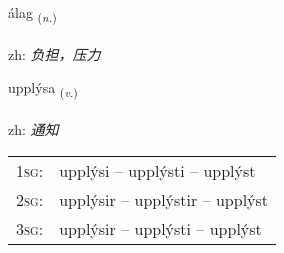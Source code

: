 \documentclass[frontgrid, backgrid]{flacards}\usepackage[]{graphicx}\usepackage[]{color}
\begin{document}
{álag \small{\textsubscript{(\textit{n.})}} \\[1ex] %
\textphonetic{[auːlaɣ]} \\
zh: \emph{负担，压力} \\  [2ex]
\renewcommand*{\arraystretch}{0.8}
}

\renewcommand{\flhead}{\vskip5pt \fboxsep=0pt {\small\bfseries\footnotesize Sagnorð | 动词}}
\renewcommand{\fcfoot}{\vskip5pt \fboxsep=0pt \hspace{2pt}{\small\bfseries\footnotesize 2K}}

\renewcommand{\blhead}{\vskip5pt {\small\bfseries\footnotesize Sagnorð | 动词 }}
\renewcommand{\bcfoot}{\vskip5pt \hspace{2pt}{\small\bfseries\footnotesize 2K}}


{upplýsa \small{\textsubscript{(\textit{v.})}} \\[1ex] %
\textphonetic{[ʏhplisa]} \\
zh: \emph{通知} \\  [2ex]
\renewcommand*{\arraystretch}{0.8}
\begin{tabular}{p{1cm}l}
\textsc{1sg}: & upplýsi -- upplýsti -- upplýst \\ 
\textsc{2sg}: & upplýsir -- upplýstir -- upplýst \\ 
\textsc{3sg}: & upplýsir -- upplýsti -- upplýst \\ 
\end{tabular}
}

\renewcommand{\flhead}{\vskip5pt \fboxsep=0pt {\small\bfseries\footnotesize Nafnorð | 名词}}
\renewcommand{\fcfoot}{\vskip5pt \fboxsep=0pt \hspace{2pt}{\small\bfseries\footnotesize 2K}}

\renewcommand{\blhead}{\vskip5pt {\small\bfseries\footnotesize Nafnorð | 名词 }}
\renewcommand{\bcfoot}{\vskip5pt \hspace{2pt}{\small\bfseries\footnotesize 2K}}
\end{document}
